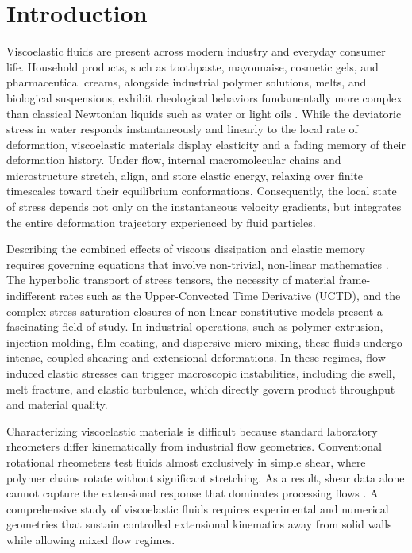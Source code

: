 \chapter{Introduction}
\label{chap:introduction}

Viscoelastic fluids are present across modern industry and everyday consumer
life. Household products, such as toothpaste, mayonnaise, cosmetic gels,
and pharmaceutical creams, alongside industrial polymer solutions, melts, and
biological suspensions, exhibit rheological behaviors fundamentally more complex
than classical Newtonian liquids such as water or light oils \cite{bird1987dynamics,
macosko1994rheology}. While the deviatoric stress in water responds instantaneously
and linearly to the local rate of deformation, viscoelastic materials display
elasticity and a fading memory of their deformation history. Under flow,
internal macromolecular chains and microstructure stretch, align, and store
elastic energy, relaxing over finite timescales toward their equilibrium
conformations. Consequently, the local state of stress depends not only on the
instantaneous velocity gradients, but integrates the entire deformation trajectory
experienced by fluid particles.

Describing the combined effects of viscous dissipation and elastic memory requires
governing equations that involve non-trivial, non-linear mathematics
\cite{owens2002computational}. The hyperbolic transport of stress tensors, the
necessity of material frame-indifferent rates such as the Upper-Convected Time
Derivative (UCTD), and the complex stress saturation closures of non-linear
constitutive models present a fascinating field of study. In
industrial operations, such as polymer extrusion, injection molding, 
film coating, and dispersive micro-mixing, these fluids undergo intense,
coupled shearing and extensional deformations. In these regimes, flow-induced
elastic stresses can trigger macroscopic instabilities, including die swell, melt
fracture, and elastic turbulence, which directly govern product throughput and
material quality.

Characterizing viscoelastic materials is difficult because standard laboratory
rheometers differ kinematically from industrial flow geometries. Conventional
rotational rheometers test fluids almost exclusively in simple shear, where
polymer chains rotate without significant stretching. As a result, shear data
alone cannot capture the extensional response that dominates processing flows
\cite{bird1987dynamics}. A comprehensive study of viscoelastic fluids requires
experimental and numerical geometries that sustain controlled extensional
kinematics away from solid walls while allowing mixed flow regimes.

